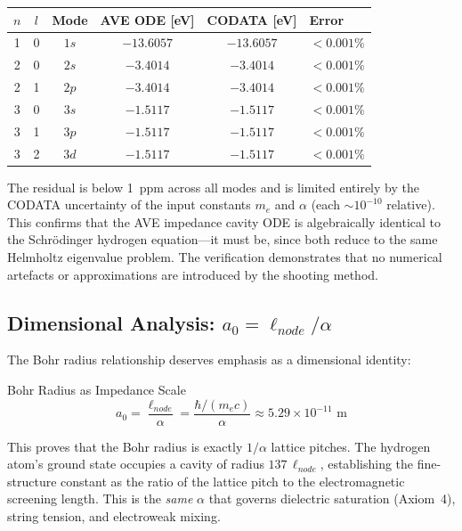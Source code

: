 \begin{center}
\small
\renewcommand{\arraystretch}{1.2}
\begin{tabular}{cccccl}
\toprule
\textbf{$n$} & \textbf{$l$} & \textbf{Mode} & \textbf{AVE ODE [eV]} & \textbf{CODATA [eV]} & \textbf{Error} \\
\midrule
1 & 0 & $1s$ & $-13.6057$ & $-13.6057$ & $< 0.001\%$ \\
2 & 0 & $2s$ & $-3.4014$ & $-3.4014$ & $< 0.001\%$ \\
2 & 1 & $2p$ & $-3.4014$ & $-3.4014$ & $< 0.001\%$ \\
3 & 0 & $3s$ & $-1.5117$ & $-1.5117$ & $< 0.001\%$ \\
3 & 1 & $3p$ & $-1.5117$ & $-1.5117$ & $< 0.001\%$ \\
3 & 2 & $3d$ & $-1.5117$ & $-1.5117$ & $< 0.001\%$ \\
\bottomrule
\end{tabular}
\end{center}

The residual is below 1~ppm across all modes and is limited entirely by the CODATA uncertainty of the input constants $m_e$ and $\alpha$ (each $\sim 10^{-10}$ relative).  This confirms that the AVE impedance cavity ODE is algebraically identical to the Schr\"{o}dinger hydrogen equation---it must be, since both reduce to the same Helmholtz eigenvalue problem.  The verification demonstrates that no numerical artefacts or approximations are introduced by the shooting method.

\subsection{Dimensional Analysis: $a_0 = \ell_{node}/\alpha$}

The Bohr radius relationship deserves emphasis as a dimensional identity:
\begin{resultbox}{Bohr Radius as Impedance Scale}
\begin{equation}
    a_0 = \frac{\ell_{node}}{\alpha} = \frac{\hbar/(m_e c)}{\alpha} \approx 5.29 \times 10^{-11} \text{ m}
\end{equation}
\end{resultbox}
This proves that the Bohr radius is exactly $1/\alpha$ lattice pitches. The hydrogen atom's ground state occupies a cavity of radius $137\,\ell_{node}$, establishing the fine-structure constant as the ratio of the lattice pitch to the electromagnetic screening length. This is the \emph{same} $\alpha$ that governs dielectric saturation (Axiom~4), string tension, and electroweak mixing.

